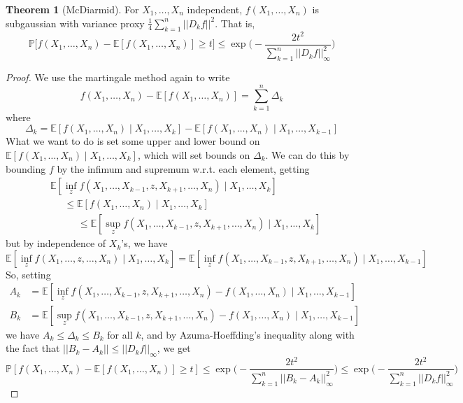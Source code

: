 \documentclass{article}
\theoremstyle{definition}
\newtheorem{theorem}{Theorem}[section]
\theoremstyle{remark}
\theoremstyle{definition}
\begin{document}
  \begin{theorem}[McDiarmid]
  For $X_1, \ldots, X_n$ independent, $f(X_1, \ldots, X_n)$ is subgaussian with variance proxy $\frac{1}{4} \sum_{k=1}^n ||D_k f||^2$. That is, 
  \[\mathbb{P}\big[ f(X_1, \ldots, X_n) - \mathbb{E}[f(X_1, \ldots, X_n)] \geq t \big] \leq \exp \bigg( -\frac{2 t^2}{\sum_{k=1}^n ||D_k f||^2_\infty} \bigg)\]
  \end{theorem}
  \begin{proof}
  We use the martingale method again to write 
  \[f(X_1, \ldots, X_n) - \mathbb{E}[f(X_1, \ldots, X_n)] = \sum_{k=1}^n \Delta_k\]
  where 
  \[\Delta_k = \mathbb{E}[f(X_1, \ldots, X_n) \mid X_1, \ldots, X_k] - \mathbb{E}[f(X_1, \ldots, X_n) \mid X_1, \ldots, X_{k-1}]\]
  What we want to do is set some upper and lower bound on $\mathbb{E}[f(X_1, \ldots, X_n) \mid X_1, \ldots, X_k]$, which will set bounds on $\Delta_k$. We can do this by bounding $f$ by the infimum and supremum w.r.t. each element, getting 
  \begin{align*}
      &\mathbb{E}[ \inf_z f(X_1, \ldots, X_{k-1}, z, X_{k+1}, \ldots, X_n) \mid X_1, \ldots, X_k] \\
      &\;\;\;\;\;\leq \mathbb{E}[f (X_1, \ldots, X_n) \mid X_1, \ldots, X_k] \\
      &\;\;\;\;\;\;\;\;\;\; \leq \mathbb{E}[ \sup_z f(X_1, \ldots, X_{k-1}, z, X_{k+1}, \ldots, X_n) \mid X_1, \ldots, X_k]
  \end{align*}
  but by independence of $X_k$'s, we have 
  \[\mathbb{E}[ \inf_z f(X_1, \ldots, z, \ldots, X_n) \mid X_1, \ldots, X_k] = \mathbb{E}[ \inf_z f(X_1, \ldots, X_{k-1}, z, X_{k+1}, \ldots, X_n) \mid X_1, \ldots, X_{k-1}]\]
  So, setting 
  \begin{align*}
      A_k & = \mathbb{E}[ \inf_z f(X_1, \ldots, X_{k-1}, z, X_{k+1}, \ldots, X_n) - f(X_1, \ldots, X_n) \mid X_1, \ldots, X_{k-1}] \\
      B_k & = \mathbb{E}[ \sup_z f(X_1, \ldots, X_{k-1}, z, X_{k+1}, \ldots, X_n) - f(X_1, \ldots, X_n) \mid X_1, \ldots, X_{k-1}]
  \end{align*}
  we have $A_k \leq \Delta_k \leq B_k$ for all $k$, and by Azuma-Hoeffding's inequality along with the fact that $||B_k - A_k|| \leq ||D_k f||_\infty$, we get 
  \[\mathbb{P}[ f(X_1, \ldots, X_n) - \mathbb{E}[ f(X_1, \ldots, X_n)] \geq t] \leq \exp \bigg(- \frac{2t^2}{\sum_{k=1}^n ||B_k - A_k||^2_\infty} \bigg) \leq \exp \bigg(- \frac{2t^2}{\sum_{k=1}^n ||D_k f||^2_\infty} \bigg)\]
  \end{proof}
\end{document}
